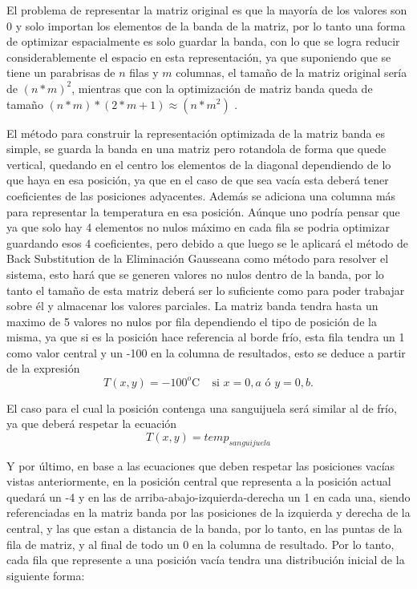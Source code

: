 El problema de representar la matriz original es que la mayoría de los valores son 0 y solo importan los elementos de la banda de la matriz, por lo tanto una forma de optimizar espacialmente es solo guardar la banda, con lo que se logra reducir considerablemente el espacio en esta representación, ya que suponiendo que se tiene un parabrisas de $n$ filas y $m$ columnas, el tamaño de la matriz original sería de $(n*m)^2$, mientras que con la optimización de matriz banda queda de tamaño $(n*m)*(2*m+1) \approx (n*m^2)$ .

El método para construir la representación optimizada de la matriz banda es simple, se guarda la banda en una matriz pero rotandola de forma que quede vertical, quedando en el centro los elementos de la diagonal dependiendo de lo que haya en esa posición, ya que en el caso de que sea vacía esta deberá tener coeficientes de las posiciones adyacentes. Además se adiciona una columna más para representar la temperatura en esa posición.
Aúnque uno podría pensar que ya que solo hay 4 elementos no nulos máximo en cada fila se podria optimizar guardando esos 4 coeficientes, pero debido a que luego se le aplicará el método de Back Substitution de la Eliminación Gausseana como método para resolver el sistema, esto hará que se generen valores no nulos dentro de la banda, por lo tanto el tamaño de esta matriz deberá ser lo suficiente como para poder trabajar sobre él y almacenar los valores parciales.
La matriz banda tendra hasta un maximo de 5 valores no nulos por fila dependiendo el tipo de posición de la misma, ya que si es la posición hace referencia al borde frío, esta fila tendra un 1 como valor central y un -100 en la columna de resultados, esto se deduce a partir de la expresión 
\begin{equation}
T(x,y) = -100^o\textrm{C}~~~~~\textrm{si } x = 0,a \textrm{ \'o } y = 0,b.
\label{eq:borde}
\end{equation}

 El caso para el cual la posición contenga una sanguijuela será similar al de frío, ya que deberá respetar la ecuación
 \begin{equation}
T(x,y) = temp_{sanguijuela}
\label{eq:borde}
\end{equation}

Y por último, en base a las ecuaciones que deben respetar las posiciones vacías vistas anteriormente, en la posición central que representa a la posición actual quedará un -4 y en las de arriba-abajo-izquierda-derecha un 1 en cada una, siendo referenciadas en la matriz banda por las posiciones de la izquierda y derecha de la central, y las que estan a distancia de la banda, por lo tanto, en las puntas de la fila de matriz, y al final de todo un 0 en la columna de resultado. Por lo tanto, cada fila que represente a una posición vacía tendra una distribución inicial de la siguiente forma:


